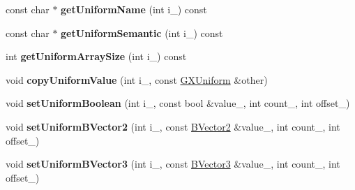 \begin{DoxyCompactItemize}
\item 
const char $\ast$ {\bfseries get\+Uniform\+Name} (int i\+\_\+) const \hypertarget{classi_dream_sky_1_1_g_x_shader_program2_a454b126f5daf9bd97fc3822991a1c6d6}{}\label{classi_dream_sky_1_1_g_x_shader_program2_a454b126f5daf9bd97fc3822991a1c6d6}

\item 
const char $\ast$ {\bfseries get\+Uniform\+Semantic} (int i\+\_\+) const \hypertarget{classi_dream_sky_1_1_g_x_shader_program2_a09f04f84642a99ff74c3b457cc0fab1e}{}\label{classi_dream_sky_1_1_g_x_shader_program2_a09f04f84642a99ff74c3b457cc0fab1e}

\item 
int {\bfseries get\+Uniform\+Array\+Size} (int i\+\_\+) const \hypertarget{classi_dream_sky_1_1_g_x_shader_program2_a3db9a9520270ee52fe5b08880e5b2783}{}\label{classi_dream_sky_1_1_g_x_shader_program2_a3db9a9520270ee52fe5b08880e5b2783}

\item 
void {\bfseries copy\+Uniform\+Value} (int i\+\_\+, const \hyperlink{class_i_dream_sky_1_1_g_x_uniform}{G\+X\+Uniform} \&other)\hypertarget{classi_dream_sky_1_1_g_x_shader_program2_a2d04c72c09f936055b40b7b539c10be1}{}\label{classi_dream_sky_1_1_g_x_shader_program2_a2d04c72c09f936055b40b7b539c10be1}

\item 
void {\bfseries set\+Uniform\+Boolean} (int i\+\_\+, const bool \&value\+\_\+, int count\+\_, int offset\+\_)\hypertarget{classi_dream_sky_1_1_g_x_shader_program2_a83a65d01b40239e75ef0a67301205f8a}{}\label{classi_dream_sky_1_1_g_x_shader_program2_a83a65d01b40239e75ef0a67301205f8a}

\item 
void {\bfseries set\+Uniform\+B\+Vector2} (int i\+\_\+, const \hyperlink{class_i_dream_sky_1_1_b_vector2}{B\+Vector2} \&value\+\_\+, int count\+\_, int offset\+\_)\hypertarget{classi_dream_sky_1_1_g_x_shader_program2_a553bae339766290bb77358415f21c3fb}{}\label{classi_dream_sky_1_1_g_x_shader_program2_a553bae339766290bb77358415f21c3fb}

\item 
void {\bfseries set\+Uniform\+B\+Vector3} (int i\+\_\+, const \hyperlink{class_i_dream_sky_1_1_b_vector3}{B\+Vector3} \&value\+\_\+, int count\+\_, int offset\+\_)\hypertarget{classi_dream_sky_1_1_g_x_shader_program2_a744e826c7d85a2a5700ac9dfc7ecd9a8}{}\label{classi_dream_sky_1_1_g_x_shader_program2_a744e826c7d85a2a5700ac9dfc7ecd9a8}


\end{DoxyCompactItemize}
